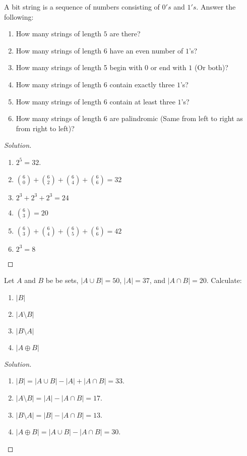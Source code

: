         \begin{problem}
        A bit string is a sequence of numbers consisting of $0's$ and $1's$. Answer the following:
        \begin{enumerate}
            \item How many strings of length $5$ are there?
            \item How many strings of length $6$ have an even number of $1$'s?
            \item How many strings of length 5 begin with $0$ or end with $1$ (Or both)?
            \item How many strings of length $6$ contain exactly three $1$'s?
            \item How many strings of length $6$ contain at least three $1$'s?
            \item How many strings of length $6$ are palindromic (Same from left to right as from right to left)?
        \end{enumerate}
        \end{problem}
        \begin{proof}[Solution]
        \vspace{-\topsep}
        \
        \begin{enumerate}
            \item $2^{5}=32$.
            \item $\binom{6}{0}+\binom{6}{2}+\binom{6}{4}+\binom{6}{6}=32$
            \item $2^{3}+2^{3}+2^{3}=24$
            \item $\binom{6}{3} = 20$
            \item $\binom{6}{3}+\binom{6}{4}+\binom{6}{5}+\binom{6}{6} = 42$
            \item $2^{3}=8$
        \end{enumerate}
        \end{proof}
        \begin{problem}
        Let $A$ and $B$ be be sets, $|A\cup B| = 50$, $|A| = 37$, and $|A\cap B| = 20$. Calculate:
        \begin{enumerate}
            \item $|B|$
            \item $|A\setminus B|$
            \item $|B\setminus A|$
            \item $|A\oplus B|$
        \end{enumerate}
        \end{problem}
        \begin{proof}[Solution]
        \par
        \begin{enumerate}
            \item $|B| = |A\cup B|-|A|+|A\cap B| = 33$.
            \item $|A\setminus B| = |A|-|A\cap B| = 17$.
            \item $|B\setminus A| = |B| - |A\cap B| = 13$.
            \item $|A\oplus B| = |A\cup B|- |A\cap B| = 30$.
        \end{enumerate}
        \end{proof}
